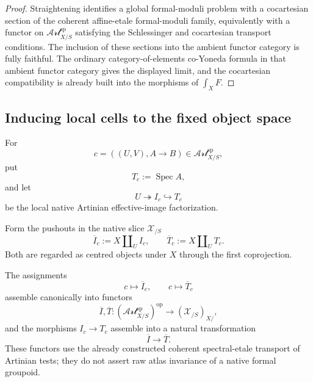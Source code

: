 \begin{proof}
Straightening identifies a global formal-moduli problem with a cocartesian
section of the coherent affine-etale formal-moduli family, equivalently with a
functor on $\mathscr{Art}^{\mathrm{sp}}_{X/S}$ satisfying the Schlessinger and
cocartesian transport conditions.  The inclusion of these sections into the
ambient functor category is fully faithful.  The ordinary category-of-elements
co-Yoneda formula in that ambient functor category gives the displayed limit,
and the cocartesian compatibility is already built into the morphisms of
$\int_XF$.
\end{proof}

\subsection{Inducing local cells to the fixed object space}

For
\[
    c=((U,V),A\to B)
    \in\mathscr{Art}^{\mathrm{sp}}_{X/S},
\]
put
\[
    T_c:=\operatorname{Spec}A,
\]
and let
\[
    U\twoheadrightarrow I_c\hookrightarrow T_c
\]
be the local native Artinian effective-image factorization.

\begin{definition}
\label{def:bnli-induced-global-cells}
Form the pushouts in the native slice $\mathcal X_{/S}$
\[
\boxed{
    \overline I_c
    :=
    X\amalg_U I_c,
    \qquad
    \overline T_c
    :=
    X\amalg_U T_c.}
\]
Both are regarded as centred objects under $X$ through the first coprojection.
\end{definition}

\begin{proposition}
\label{prop:bnli-induced-cell-functoriality}
The assignments
\[
    c\longmapsto \overline I_c,
    \qquad
    c\longmapsto \overline T_c
\]
assemble canonically into functors
\[
\boxed{
    \overline I,\overline T:
    \left(\mathscr{Art}^{\mathrm{sp}}_{X/S}\right)^{\mathrm{op}}
    \longrightarrow
    (\mathcal X_{/S})_{X/},}
\]
and the morphisms $I_c\to T_c$ assemble into a natural transformation
\[
    \overline I\longrightarrow\overline T.
\]
These functors use the already constructed coherent spectral-etale transport
of Artinian tests; they do not assert raw atlas invariance of a native formal
groupoid.
\end{proposition}


